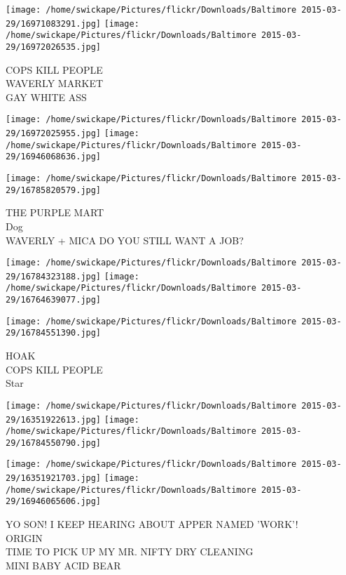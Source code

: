 \documentclass[10pt,letterpaper]{article}
\begin{document}
\vspace{0.25in}
\texttt{[image: /home/swickape/Pictures/flickr/Downloads/Baltimore 2015-03-29/16971083291.jpg]}
\texttt{[image: /home/swickape/Pictures/flickr/Downloads/Baltimore 2015-03-29/16972026535.jpg]}

COPS KILL PEOPLE\\
WAVERLY MARKET\\
GAY WHITE ASS
\pagebreak

\texttt{[image: /home/swickape/Pictures/flickr/Downloads/Baltimore 2015-03-29/16972025955.jpg]}
\texttt{[image: /home/swickape/Pictures/flickr/Downloads/Baltimore 2015-03-29/16946068636.jpg]}

\vspace{0.25in}
\texttt{[image: /home/swickape/Pictures/flickr/Downloads/Baltimore 2015-03-29/16785820579.jpg]}

THE PURPLE MART\\
Dog\\
WAVERLY + MICA DO YOU STILL WANT A JOB?
\pagebreak

\texttt{[image: /home/swickape/Pictures/flickr/Downloads/Baltimore 2015-03-29/16784323188.jpg]}
\texttt{[image: /home/swickape/Pictures/flickr/Downloads/Baltimore 2015-03-29/16764639077.jpg]}

\vspace{0.25in}
\texttt{[image: /home/swickape/Pictures/flickr/Downloads/Baltimore 2015-03-29/16784551390.jpg]}

HOAK\\
COPS KILL PEOPLE\\
Star
\pagebreak

\texttt{[image: /home/swickape/Pictures/flickr/Downloads/Baltimore 2015-03-29/16351922613.jpg]}
\texttt{[image: /home/swickape/Pictures/flickr/Downloads/Baltimore 2015-03-29/16784550790.jpg]}

\texttt{[image: /home/swickape/Pictures/flickr/Downloads/Baltimore 2015-03-29/16351921703.jpg]}
\texttt{[image: /home/swickape/Pictures/flickr/Downloads/Baltimore 2015-03-29/16946065606.jpg]}

YO SON!  I KEEP HEARING ABOUT APPER NAMED 'WORK'!\\
ORIGIN\\
TIME TO PICK UP MY MR. NIFTY DRY CLEANING\\
MINI BABY ACID BEAR
\pagebreak
\end{document}
